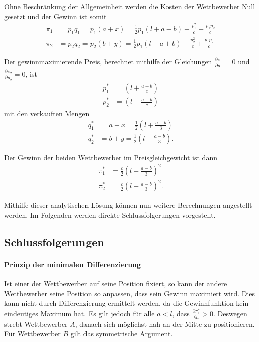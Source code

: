 Ohne Beschränkung der Allgemeinheit werden die Kosten der Wettbewerber Null gesetzt und der Gewinn ist somit \citep[S.\,46]{hotelling1929}
\begin{equation}
\begin{split}
\pi_1 &= p_1 q_1 = p_1 (a+x) = \tfrac{1}{2} p_1 \left(l+a-b\right) -\frac{p_1^2}{c}+\frac{p_1 p_2}{c}\\
\pi_2 &= p_2 q_2 = p_2 (b+y) = \tfrac{1}{2} p_1 \left(l-a+b\right) -\frac{p_2^2}{c}+\frac{p_1 p_2}{c}
\end{split}
\end{equation}

Der gewinnmaximierende Preis, berechnet mithilfe der Gleichungen $\frac{\partial \pi_1}{\partial p_1}=0$ und $\frac{\partial \pi_2}{\partial p_2}=0$, ist \citep[S.\,46]{hotelling1929}
\begin{equation}
\begin{split}
p_1^* &= \left(l+\frac{a-b}{c}\right) \\
p_2^* &= \left(l-\frac{a-b}{c}\right)
\end{split}
\end{equation}
mit den verkauften Mengen
\begin{equation}
\begin{split}
q_1^* &= a + x = \tfrac{1}{2} \left(l + \frac{a-b}{3}\right) \\
q_2^* &= b + y = \tfrac{1}{2} \left(l - \frac{a-b}{3}\right)
.\end{split}
\end{equation}

Der Gewinn der beiden Wettbewerber im Preisgleichgewicht ist dann \citep[S.\,50]{hotelling1929}
\begin{equation}\label{eqn:Gewinnfunktion}
\begin{split}
\pi_1^* &= \frac{c}{2} \left(l+\frac{a-b}{3}\right)^2 \\
\pi_2^* &= \frac{c}{2} \left(l-\frac{a-b}{3}\right)^2
.\end{split}
\end{equation}

Mithilfe dieser analytischen Lösung können nun weitere Berechnungen angestellt werden.
Im Folgenden werden direkte Schlussfolgerungen vorgestellt.

\subsection{Schlussfolgerungen}
\paragraph{Prinzip der minimalen Differenzierung}
Ist einer der Wettbewerber auf seine Position fixiert, so kann der andere Wettbewerber seine Position so anpassen, dass sein Gewinn maximiert wird.
Dies kann nicht durch Differenzierung ermittelt werden, da die Gewinnfunktion kein eindeutiges Maximum hat.
Es gilt jedoch für alle $a<l$, dass $\frac{\partial \pi_1^*}{\partial a} > 0$. Deswegen strebt Wettbewerber $A$, danach sich möglichst nah an der Mitte zu positionieren.
Für Wettbewerber $B$ gilt das symmetrische Argument. \citep[S.\,51-2]{hotelling1929}

